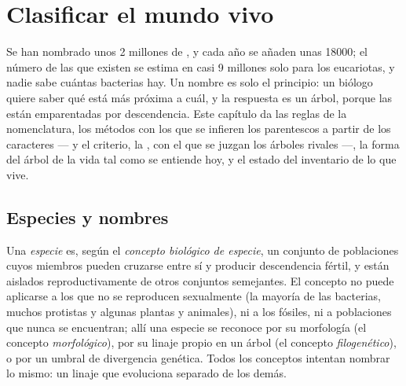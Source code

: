 \chapter{Clasificar el mundo vivo}\label{ch:b1:classifying-biodiversity}

Se han nombrado unos \num{2} millones de , y cada año se añaden unas
\num{18000}; el número de las que existen se estima en casi \num{9} millones
solo para los eucariotas, y nadie sabe cuántas bacterias hay. Un nombre es
solo el principio: un biólogo quiere saber qué  está más próxima a
cuál, y la respuesta es un árbol, porque las  están emparentadas por
descendencia. Este capítulo da las reglas de la nomenclatura, los métodos
con los que se infieren los parentescos a partir de los caracteres --- y el
criterio, la , con el que se juzgan los árboles rivales ---, la
forma del árbol de la vida tal como se entiende hoy, y el estado del
inventario de lo que vive.

\section{Especies y nombres}

\begin{definition}[Especie]\label{def:b1:classifying-biodiversity:species}
Una \emph{especie} es, según el \emph{concepto biológico de especie}, un
conjunto de poblaciones cuyos miembros pueden cruzarse entre sí y producir
descendencia fértil, y están aislados reproductivamente de otros conjuntos
semejantes. El concepto no puede aplicarse a los  que no se
reproducen sexualmente (la mayoría de las bacterias, muchos protistas y
algunas plantas y animales), ni a los fósiles, ni a poblaciones que nunca se
encuentran; allí una especie se reconoce por su morfología (el concepto
\emph{morfológico}), por su linaje propio en un árbol (el concepto
\emph{filogenético}), o por un umbral de divergencia genética. Todos los
conceptos intentan nombrar lo mismo: un linaje que evoluciona separado de
los demás.
\end{definition}

